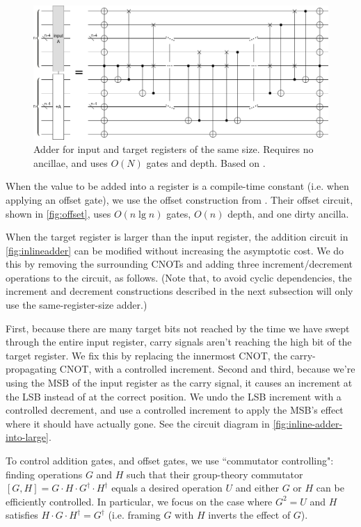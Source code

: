 \documentclass[twocolumn,longbibliography]{quantumarticle}
\begin{document}
\begin{figure}
  \centering
  \includegraphics[width=\linewidth]{assets/inline-adder.png}
  \caption{ Adder for input and target registers of the same size.
  Requires no ancillae, and uses $O(N)$ gates and depth.
  Based on \cite{van2004, takahashi2005}.}
  \label{fig:inlineadder}
\end{figure}

When the value to be added into a register is a compile-time constant (i.e. when applying an offset gate), we use the offset construction from \cite{haner2016}.
Their offset circuit, shown in \autoref{fig:offset}, uses $O(n \lg n)$ gates, $O(n)$ depth, and one dirty ancilla.

When the target register is larger than the input register, the addition circuit in \autoref{fig:inlineadder} can be modified without increasing the asymptotic cost.
We do this by removing the surrounding CNOTs and adding three increment/decrement operations to the circuit, as follows.
(Note that, to avoid cyclic dependencies, the increment and decrement constructions described in the next subsection will only use the same-register-size adder.)

First, because there are many target bits not reached by the time we have swept through the entire input register, carry signals aren't reaching the high bit of the target register.
We fix this by replacing the innermost CNOT, the carry-propagating CNOT, with a controlled increment.
Second and third, because we're using the MSB of the input register as the carry signal, it causes an increment at the LSB instead of at the correct position.
We undo the LSB increment with a controlled decrement, and use a controlled increment to apply the MSB's effect where it should have actually gone.
See the circuit diagram in \autoref{fig:inline-adder-into-large}.

To control addition gates, and offset gates, we use ``commutator controlling": finding operations $G$ and $H$ such that their group-theory commutator $[G, H] = G \cdot H \cdot G^\dagger \cdot H^\dagger$ equals a desired operation $U$ and either $G$ or $H$ can be efficiently controlled.
In particular, we focus on the case where $G^2 = U$ and $H$ satisfies $H \cdot G \cdot H^\dagger = G^\dagger$ (i.e. framing $G$ with $H$ inverts the effect of $G$).
\end{document}
